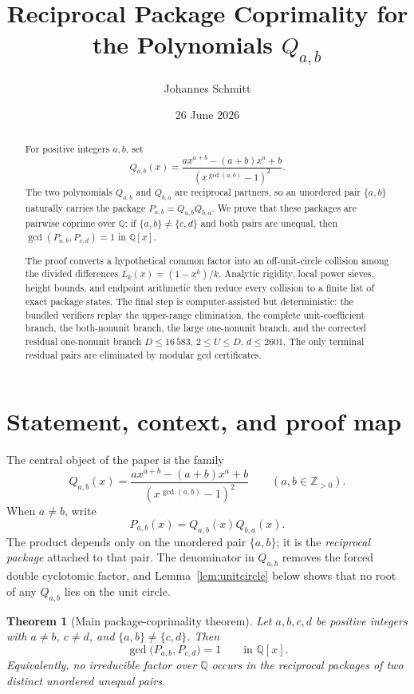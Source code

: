 \documentclass[11pt]{article}
\title{Reciprocal Package Coprimality for the Polynomials \(Q_{a,b}\)}
\author{Johannes Schmitt}
\date{26 June 2026}
\newtheorem{theorem}{Theorem}[section]
\theoremstyle{definition}
\newcommand{\Q}{\mathbb Q}
\newcommand{\Z}{\mathbb Z}
\begin{document}
\maketitle


\begin{abstract}
For positive integers \(a,b\), set
\[
 Q_{a,b}(x)=
 \frac{a x^{a+b}-(a+b)x^a+b}{(x^{\gcd(a,b)}-1)^2}.
\]
The two polynomials \(Q_{a,b}\) and \(Q_{b,a}\) are reciprocal partners, so an
unordered pair \(\{a,b\}\) naturally carries the package
\(P_{a,b}=Q_{a,b}Q_{b,a}\).  We prove that these packages are pairwise coprime
over \(\Q\): if \(\{a,b\}\neq\{c,d\}\) and both pairs are unequal, then
\(\gcd(P_{a,b},P_{c,d})=1\) in \(\Q[x]\).

The proof converts a hypothetical common factor into an off-unit-circle
collision among the divided differences \(L_k(x)=(1-x^k)/k\).  Analytic
rigidity, local power sieves, height bounds, and endpoint arithmetic then
reduce every collision to a finite list of exact package states.  The final
step is computer-assisted but deterministic: the bundled verifiers replay the
upper-range elimination, the complete unit-coefficient branch, the
both-nonunit branch, the large one-nonunit branch, and the corrected residual
one-nonunit branch \(D\leq16\,583\), \(2\leq U\leq D\), \(d\leq2601\).  The
only terminal residual pairs are eliminated by modular gcd certificates.
\end{abstract}

\tableofcontents


\section{Statement, context, and proof map}

The central object of the paper is the family
\[
 Q_{a,b}(x)=
 \frac{a x^{a+b}-(a+b)x^a+b}{(x^{\gcd(a,b)}-1)^2}
 \qquad(a,b\in\Z_{>0}).
\]
When \(a\neq b\), write
\[
 P_{a,b}(x)=Q_{a,b}(x)Q_{b,a}(x).
\]
The product depends only on the unordered pair \(\{a,b\}\); it is the
\emph{reciprocal package} attached to that pair.  The denominator in
\(Q_{a,b}\) removes the forced double cyclotomic factor, and
Lemma~\ref{lem:unitcircle} below shows that no root of any \(Q_{a,b}\)
lies on the unit circle.

\begin{theorem}[Main package-coprimality theorem]\label{thm:main}
Let \(a,b,c,d\) be positive integers with \(a\neq b\), \(c\neq d\), and
\(\{a,b\}\neq\{c,d\}\).  Then
\[
 \gcd\bigl(P_{a,b},P_{c,d}\bigr)=1
 \qquad\text{in }\Q[x].
\]
Equivalently, no irreducible factor over \(\Q\) occurs in the reciprocal
packages of two distinct unordered unequal pairs.
\end{theorem}
\end{document}
